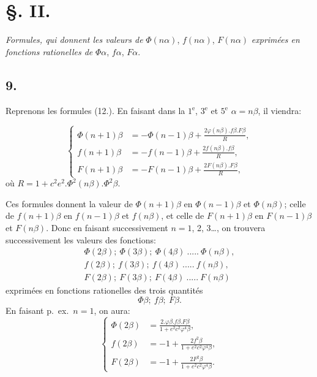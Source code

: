 \documentclass{article}
\begin{document}
\section*{§. II.}

\emph{Formules, qui donnent les valeurs de} $\Phi(n\alpha)$, $f(n\alpha)$, $F(n\alpha)$ \emph{exprimées en fonctions rationelles de} $\Phi\alpha$, $f\alpha$, $F\alpha$.

\subsection*{9.}

Reprenons les formules (12.). En faisant dans la $1{}^{\mathrm{e}}$, $3{}^{\mathrm{e}}$ et $5{}^{\mathrm{e}}$ $\alpha=n\beta$, il viendra:

\[ \left\{\begin{aligned} \Phi(n+1)\beta&=-\Phi(n-1)\beta+\frac{2\varphi(n\beta).f\beta.F\beta}{R},\\ f(n+1)\beta&=-f(n-1)\beta+\frac{2f(n\beta).f\beta}{R},\\ F(n+1)\beta&=-F(n-1)\beta+\frac{2F(n\beta).F\beta}{R}, \end{aligned}\right. \tag{34.} \]
où $R=1+c^{2}e^{2}.\Phi^{2}(n\beta).\Phi^{2}\beta$.

Ces formules donnent la valeur de $\Phi(n+1)\beta$ en $\Phi(n-1)\beta$ et $\Phi(n\beta)$; celle de $f(n+1)\beta$ en $f(n-1)\beta$ et $f(n\beta)$, et celle de $F(n+1)\beta$ en $F(n-1)\beta$ et $F(n\beta)$. Donc en faisant successivement $n=1$, 2, 3\ldots, on trouvera successivement les valeurs des fonctions:
\[ \begin{gathered} \Phi(2\beta);\ \Phi(3\beta);\ \Phi(4\beta)\ .....\ \Phi(n\beta),\\ f(2\beta);\ f(3\beta);\ f(4\beta)\ .....\ f(n\beta),\\ F(2\beta);\ F(3\beta);\ F(4\beta)\ .....\ F(n\beta) \end{gathered} \]
exprimées en fonctions rationelles des trois quantités
\[ \Phi\beta;\ f\beta;\ F\beta. \]
En faisant p.\ ex.\ $n=1$, on aura:
\[ \left\{\begin{aligned} \Phi(2\beta)&=\frac{2.\varphi\beta.f\beta.F\beta}{1+e^{2}c^{2}\varphi^{4}\beta},\\ f(2\beta)&=-1+\frac{2f^{2}\beta}{1+e^{2}c^{2}\varphi^{4}\beta},\\ F(2\beta)&=-1+\frac{2F^{2}\beta}{1+e^{2}c^{2}\varphi^{4}\beta}. \end{aligned}\right. \tag{35.} \]
\end{document}
